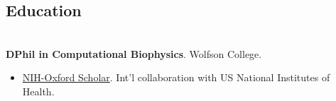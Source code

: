 \documentclass[margin]{res}
\begin{document}
 
\begin{sloppypar}
 
 




\begin{resume} 
\setlength{\parskip}{1.00ex}
\setlength{\parindent}{0pt}
 
\section{Education} 
\\
\textbf{DPhil in Computational Biophysics}. Wolfson College.

\begin{itemize}
    \item \href{http://oxcam.gpp.nih.gov/}{NIH-Oxford Scholar}. Int'l collaboration with US National Institutes of Health.
\end{itemize}



\end{resume}
\end{sloppypar}
\end{document}
